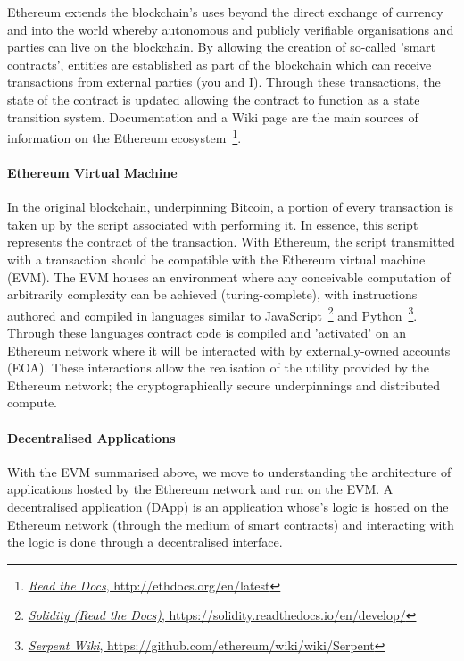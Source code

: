Ethereum extends the blockchain's uses beyond the direct exchange of currency and into the world whereby autonomous and publicly verifiable organisations and parties can live on the blockchain. By allowing the creation of so-called 'smart contracts', entities are established as part of the blockchain which can receive transactions from external parties (you and I). Through these transactions, the state of the contract is updated allowing the contract to function as a state transition system. Documentation and a Wiki page are the main sources of information on the Ethereum ecosystem~\footnote{\href{http://ethdocs.org/en/latest}{\textit{Read the Docs}, http://ethdocs.org/en/latest}}.

\paragraph{Ethereum Virtual Machine}

In the original blockchain, underpinning Bitcoin, a portion of every transaction is taken up by the script associated with performing it. In essence, this script represents the contract of the transaction. With Ethereum, the script transmitted with a transaction should be compatible with the Ethereum virtual machine (EVM). The EVM houses an environment where any conceivable computation of arbitrarily complexity can be achieved (turing-complete), with instructions authored and compiled in languages similar to JavaScript~\footnote{\href{https://solidity.readthedocs.io/en/develop/}{\textit{Solidity (Read the Docs)}, https://solidity.readthedocs.io/en/develop/}} and Python~\footnote{\href{https://github.com/ethereum/wiki/wiki/Serpent}{\textit{Serpent Wiki}, https://github.com/ethereum/wiki/wiki/Serpent}}. Through these languages contract code is compiled and 'activated' on an Ethereum network where it will be interacted with by externally-owned accounts (EOA). These interactions allow the realisation of the utility provided by the Ethereum network; the cryptographically secure underpinnings and distributed compute.

\paragraph{Decentralised Applications}

With the EVM summarised above, we move to understanding the architecture of applications hosted by the Ethereum network and run on the EVM. A decentralised application (DApp) is an application whose's logic is hosted on the Ethereum network (through the medium of smart contracts) and interacting with the logic is done through a decentralised interface.

